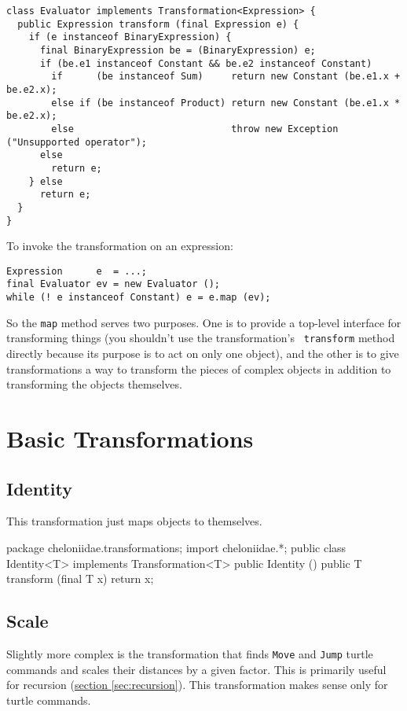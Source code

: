 \documentclass{report}
\newcommand{\Ref}[2]{\hyperref[#2]{#1 \ref*{#2}}}
\begin{document}
\begin{verbatim}
class Evaluator implements Transformation<Expression> {
  public Expression transform (final Expression e) {
    if (e instanceof BinaryExpression) {
      final BinaryExpression be = (BinaryExpression) e;
      if (be.e1 instanceof Constant && be.e2 instanceof Constant)
        if      (be instanceof Sum)     return new Constant (be.e1.x + be.e2.x);
        else if (be instanceof Product) return new Constant (be.e1.x * be.e2.x);
        else                            throw new Exception ("Unsupported operator");
      else
        return e;
    } else
      return e;
  }
}
\end{verbatim}

      To invoke the transformation on an expression:

\begin{verbatim}
Expression      e  = ...;
final Evaluator ev = new Evaluator ();
while (! e instanceof Constant) e = e.map (ev);
\end{verbatim}

      So the {\tt map} method serves two purposes. One is to provide a top-level interface for transforming things (you shouldn't use the transformation's {\tt
      transform} method directly because its purpose is to act on only one object), and the other is to give transformations a way to transform the pieces of
      complex objects in addition to transforming the objects themselves.

\section {Basic Transformations} \label{sec:basic-transformations}
\subsection {Identity} \label{sec:identity}
        This transformation just maps objects to themselves.

\begin{javacode}
package cheloniidae.transformations;
import cheloniidae.*;
public class Identity<T> implements Transformation<T> {
  public Identity () {}
  public T transform (final T x) {return x;}
}
\end{javacode}

\subsection {Scale} \label{sec:scale}
        Slightly more complex is the transformation that finds {\tt Move} and {\tt Jump} turtle commands and scales their distances by a given factor. This is
        primarily useful for recursion (\Ref{section}{sec:recursion}). This transformation makes sense only for turtle commands.
\end{document}
